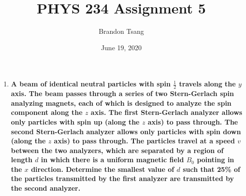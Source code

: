 \documentclass[11pt]{article}
\title{PHYS 234 Assignment 5}
\author{Brandon Tsang}
\date{June 19, 2020}
\begin{document}
    \maketitle
    \begin{enumerate}[label=\textbf{\arabic*.}]
        \item{
            \textbf{\boldmath A beam of identical neutral particles with spin \(\frac 1 2\) travels along the \(y\) axis. The beam passes through a series of two Stern-Gerlach spin analyzing magnets, each of which is designed to analyze the spin component along the \(z\) axis. The first Stern-Gerlach analyzer allows only particles with spin up (along the \(z\) axis) to pass through. The second Stern-Gerlach analyzer allows only particles with spin down (along the \(z\) axis) to pass through. The particles travel at a speed \(v\) between the two analyzers, which are separated by a region of length \(d\) in which there is a uniform magnetic field \(B_0\) pointing in the \(x\) direction. Determine the smallest value of \(d\) such that 25\% of the particles transmitted by the first analyzer are transmitted by the second analyzer.}
        }
    \end{enumerate}
\end{document}
